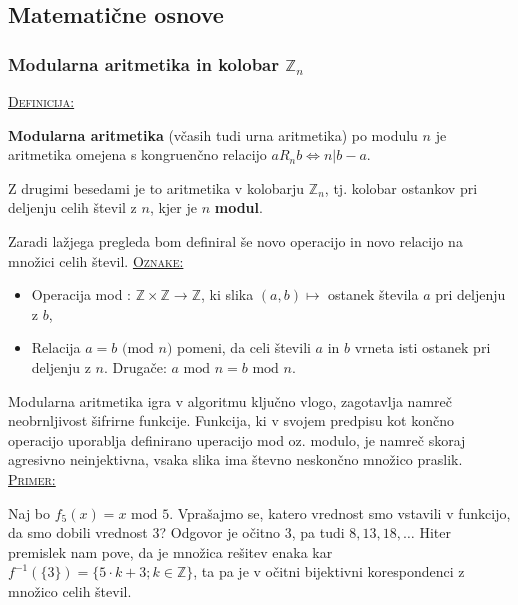 \documentclass[a4paper, 12pt]{article} %
\newcommand{\Zn}{\mathbb{Z}_n}
\newenvironment{matematika}[1]{
\textcolor{bostonuniversityred}{\underline{\textsc{#1:}}}
}{
}
\begin{document}
\subsection{Matematične osnove}

\subsubsection{Modularna aritmetika in kolobar $\Zn$}

\begin{matematika}{Definicija}
\textbf{Modularna aritmetika} (včasih tudi urna aritmetika) po modulu $n$ je aritmetika omejena s kongruenčno relacijo $a R_n b \iff n | b - a$.

Z drugimi besedami je to aritmetika v kolobarju $\Zn$, tj. kolobar ostankov pri deljenju celih števil z $n$, kjer je $n$ \textbf{modul}.
\end{matematika}
\newline
\newline
Zaradi lažjega pregleda bom definiral še novo operacijo in novo relacijo na množici celih števil.
\newline
\newline
\begin{matematika}{Oznake}
\begin{itemize}[label=]
\item Operacija mod : $\mathbb{Z} \times \mathbb{Z} \to \mathbb{Z}$, ki slika $(a, b) \mapsto$ ostanek števila $a$ pri deljenju z $b$,
\item Relacija $a = b \text{ (mod   } n)$ pomeni, da celi števili $a$ in $b$ vrneta isti ostanek pri deljenju z $n$. Drugače: $a \text{  mod  } n = b \text{ mod } n$. 
\end{itemize}
\end{matematika}


Modularna aritmetika igra v algoritmu ključno vlogo, zagotavlja namreč neobrnljivost šifrirne funkcije. Funkcija, ki v svojem predpisu kot končno operacijo uporablja definirano uperacijo mod oz. modulo, je namreč skoraj agresivno neinjektivna, vsaka slika ima števno neskončno množico praslik.
\newline
\newline
\begin{matematika}{Primer}
Naj bo $f_5(x) = x \text{ mod } 5$. Vprašajmo se, katero vrednost smo vstavili v funkcijo, da smo dobili vrednost $3$?
\newline
Odgovor je očitno $3$, pa tudi $8, 13, 18, \dots$ Hiter premislek nam pove, da je množica rešitev enaka kar $f^{-1}(\{ 3 \}) = \{ 5 \cdot k + 3; k \in \mathbb{Z} \}$, ta pa je v očitni bijektivni korespondenci z množico celih števil.
\end{matematika}
\end{document}
